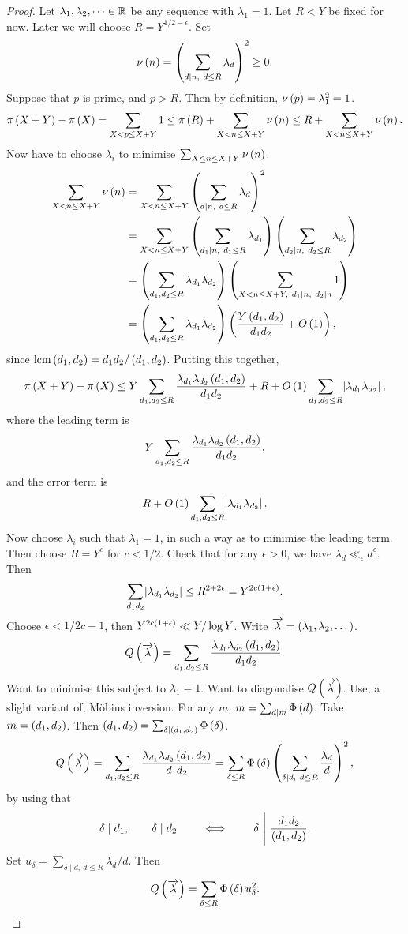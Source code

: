 \begin{proof}
Let $ \lambda_1, \lambda_2, \dots \in \mathbb{R} $ be any sequence with $ \lambda_1 = 1 $. Let $ R < Y $ be fixed for now. Later we will choose $ R = Y^{1 / 2 - \epsilon} $. Set
$$ \nu\br{n} = \br{\sum_{d \mid n, \ d \le R} \lambda_d}^2 \ge 0. $$
Suppose that $ p $ is prime, and $ p > R $. Then by definition, $ \nu\br{p} = \lambda_1^2 = 1 $.
$$ \pi\br{X + Y} - \pi\br{X} = \sum_{X < p \le X + Y} 1 \le \pi\br{R} + \sum_{X < n \le X + Y} \nu\br{n} \le R + \sum_{X < n \le X + Y} \nu\br{n}. $$
Now have to choose $ \lambda_i $ to minimise $ \sum_{X \le n \le X + Y} \nu\br{n} $.
\begin{align*}
\sum_{X < n \le X + Y} \nu\br{n}
& = \sum_{X < n \le X + Y} \br{\sum_{d \mid n, \ d \le R} \lambda_d}^2 \\
& = \sum_{X < n \le X + Y} \br{\sum_{d_1 \mid n, \ d_1 \le R} \lambda_{d_1}}\br{\sum_{d_2 \mid n, \ d_2 \le R} \lambda_{d_2}} \\
& = \br{\sum_{d_1, d_2 \le R} \lambda_{d_1}\lambda_{d_2}}\br{\sum_{X < n \le X + Y, \ d_1 \mid n, \ d_2 \mid n} 1} \\
& = \br{\sum_{d_1, d_2 \le R} \lambda_{d_1}\lambda_{d_2}}\br{\dfrac{Y\br{d_1, d_2}}{d_1d_2} + O\br{1}},
\end{align*}
since $ \mathrm{lcm}\br{d_1, d_2} = d_1d_2 / \br{d_1, d_2} $. Putting this together,
$$ \pi\br{X + Y} - \pi\br{X} \le Y\sum_{d_1, d_2 \le R} \dfrac{\lambda_{d_1}\lambda_{d_2}\br{d_1, d_2}}{d_1d_2} + R + O\br{1}\sum_{d_1, d_2 \le R} \abs{\lambda_{d_1}\lambda_{d_2}}, $$
where the leading term is
$$ Y\sum_{d_1, d_2 \le R} \dfrac{\lambda_{d_1}\lambda_{d_2}\br{d_1, d_2}}{d_1d_2}, $$
and the error term is
$$ R + O\br{1}\sum_{d_1, d_2 \le R} \abs{\lambda_{d_1}\lambda_{d_2}}. $$
Now choose $ \lambda_i $ such that $ \lambda_1 = 1 $, in such a way as to minimise the leading term. Then choose $ R = Y^c $ for $ c < 1 / 2 $. Check that for any $ \epsilon > 0 $, we have $ \lambda_d \ll_\epsilon d^\epsilon $. Then
$$ \sum_{d_1d_2} \abs{\lambda_{d_1}\lambda_{d_2}} \le R^{2 + 2\epsilon} = Y^{2c\br{1 + \epsilon}}. $$
Choose $ \epsilon < 1 / 2c - 1 $, then $ Y^{2c\br{1 + \epsilon}} \ll Y / \log Y $. Write $ \overrightarrow{\lambda} = \br{\lambda_1, \lambda_2, \dots} $.
$$ Q\br{\overrightarrow{\lambda}} = \sum_{d_1, d_2 \le R} \dfrac{\lambda_{d_1}\lambda_{d_2}\br{d_1, d_2}}{d_1d_2}. $$
Want to minimise this subject to $ \lambda_1 = 1 $. Want to diagonalise $ Q\br{\overrightarrow{\lambda}} $. Use, a slight variant of, M\"obius inversion. For any $ m $, $ m = \sum_{d \mid m} \Phi\br{d} $. Take $ m = \br{d_1, d_2} $. Then $ \br{d_1, d_2} = \sum_{\delta \mid \br{d_1, d_2}} \Phi\br{\delta} $.
$$ Q\br{\overrightarrow{\lambda}} = \sum_{d_1, d_2 \le R} \dfrac{\lambda_{d_1}\lambda_{d_2}\br{d_1, d_2}}{d_1d_2} = \sum_{\delta \le R} \Phi\br{\delta}\br{\sum_{\delta \mid d, \ d \le R} \dfrac{\lambda_d}{d}}^2, $$
by using that
$$ \delta \mid d_1, \qquad \delta \mid d_2 \qquad \iff \qquad \delta \ \Bigg| \ \dfrac{d_1d_2}{\br{d_1, d_2}}. $$
Set $ u_\delta = \sum_{\delta \mid d, \ d \le R} \lambda_d / d $.
Then
$$ Q\br{\overrightarrow{\lambda}} = \sum_{\delta \le R} \Phi\br{\delta}u_\delta^2. $$


\end{proof}
